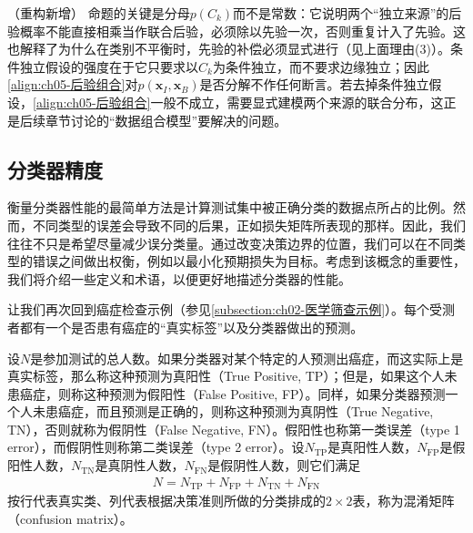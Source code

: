 \documentclass[../../main.tex]{subfiles}
\begin{document}
\begin{remark}（重构新增）
命题的关键是分母$p(C_k)$而不是常数：它说明两个“独立来源”的后验概率不能直接相乘当作联合后验，必须除以先验一次，否则重复计入了先验。这也解释了为什么在类别不平衡时，先验的补偿必须显式进行（见上面理由(3)）。条件独立假设的强度在于它只要求以$C_k$为条件独立，而不要求边缘独立；因此\eqref{align:ch05-后验组合}对$p(\boldsymbol{x}_{I},\boldsymbol{x}_{B})$是否分解不作任何断言。若去掉条件独立假设，\eqref{align:ch05-后验组合}一般不成立，需要显式建模两个来源的联合分布，这正是后续章节讨论的“数据组合模型”要解决的问题。
\end{remark}

\subsection{分类器精度}\label{subsection:ch05-分类器精度}

衡量分类器性能的最简单方法是计算测试集中被正确分类的数据点所占的比例。然而，不同类型的误差会导致不同的后果，正如损失矩阵所表现的那样。因此，我们往往不只是希望尽量减少误分类量。通过改变决策边界的位置，我们可以在不同类型的错误之间做出权衡，例如以最小化预期损失为目标。考虑到该概念的重要性，我们将介绍一些定义和术语，以便更好地描述分类器的性能。

让我们再次回到癌症检查示例（参见\cref{subsection:ch02-医学筛查示例}）。每个受测者都有一个是否患有癌症的“真实标签”以及分类器做出的预测。

\begin{definition}\label{definition:ch05-混淆矩阵}
设$N$是参加测试的总人数。如果分类器对某个特定的人预测出癌症，而这实际上是真实标签，那么称这种预测为真阳性（True Positive, TP）；但是，如果这个人未患癌症，则称这种预测为假阳性（False Positive, FP）。同样，如果分类器预测一个人未患癌症，而且预测是正确的，则称这种预测为真阴性（True Negative, TN），否则就称为假阴性（False Negative, FN）。假阳性也称第一类误差（type 1 error），而假阴性则称第二类误差（type 2 error）。设$N_{\mathrm{TP}}$是真阳性人数，$N_{\mathrm{FP}}$是假阳性人数，$N_{\mathrm{TN}}$是真阴性人数，$N_{\mathrm{FN}}$是假阴性人数，则它们满足
\begin{align}
  N=N_{\mathrm{TP}}+N_{\mathrm{FP}}+N_{\mathrm{TN}}+N_{\mathrm{FN}}
  \label{align:ch05-计数分解}
\end{align}
按行代表真实类、列代表根据决策准则所做的分类排成的$2\times2$表，称为混淆矩阵（confusion matrix）。
\end{definition}
\end{document}
